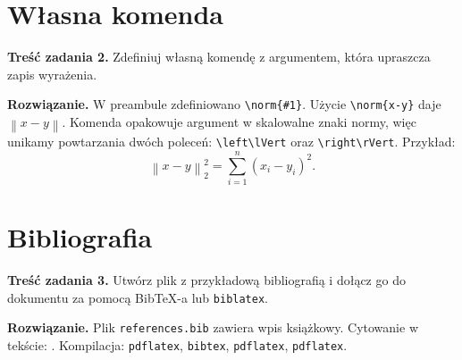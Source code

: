 \documentclass[11pt,a4paper]{article}
\theoremstyle{definition}
\numberwithin{equation}{section}
\newcommand{\norm}[1]{\left\lVert #1\right\rVert}
\begin{document}
\section{Własna komenda}
\noindent\textbf{Treść zadania 2.} Zdefiniuj własną komendę z argumentem,
która upraszcza zapis wyrażenia.

\medskip
\noindent\textbf{Rozwiązanie.} W preambule zdefiniowano
\verb|\norm{#1}|. Użycie \verb|\norm{x-y}| daje $\norm{x-y}$.
Komenda opakowuje argument w skalowalne znaki normy, więc
unikamy powtarzania dwóch poleceń: \verb|\left\lVert|
oraz \verb|\right\rVert|. Przykład:
\begin{equation}
\norm{x-y}_2^2=\sum_{i=1}^{n}(x_i-y_i)^2.
\end{equation}

\section{Bibliografia}
\noindent\textbf{Treść zadania 3.} Utwórz plik z przykładową
bibliografią i dołącz go do dokumentu za pomocą BibTeX-a
lub \texttt{biblatex}.

\medskip
\noindent\textbf{Rozwiązanie.} Plik \texttt{references.bib} zawiera wpis
książkowy. Cytowanie w tekście: \cite{lamport1994}.
Kompilacja: \texttt{pdflatex}, \texttt{bibtex},
\texttt{pdflatex}, \texttt{pdflatex}.


\end{document}
